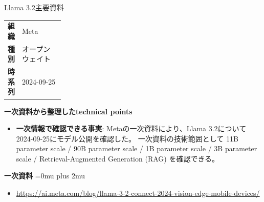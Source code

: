 \begin{technicalnote}{Llama 3.2}{主要資料}
\begingroup
\begin{tabularx}{\linewidth}{@{}>{\bfseries}p{0.22\linewidth}X@{}}
組織 & Meta \\
種別 & オープンウェイト \\
時系列 & 2024-09-25 \\
\end{tabularx}
\smallskip
{\bfseries 一次資料から整理したtechnical points}
\begin{itemize}[leftmargin=1.5em,itemsep=0.35em]
\item \textbf{一次情報で確認できる事実}: Metaの一次資料により、Llama 3.2について2024-09-25にモデル公開を確認した。 一次資料の技術範囲として 11B parameter scale / 90B parameter scale / 1B parameter scale / 3B parameter scale / Retrieval-Augmented Generation (RAG) を確認できる。
\end{itemize}
\begin{minipage}{\linewidth}
\begin{samepage}
{\bfseries 一次資料}
\begingroup\sloppy
\Urlmuskip=0mu plus 2mu\relax
\begin{itemize}[leftmargin=1.5em,itemsep=0.25em]
\item {\scriptsize\url{https://ai.meta.com/blog/llama-3-2-connect-2024-vision-edge-mobile-devices/}}
\end{itemize}
\endgroup
\end{samepage}
\end{minipage}
\endgroup
\end{technicalnote}
\medskip

